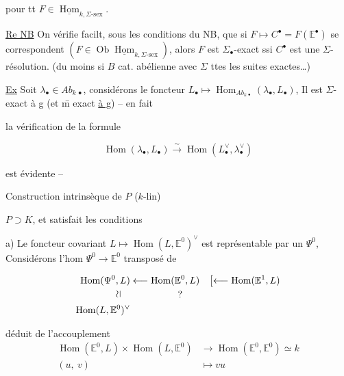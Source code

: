 pour tt $F\in\underline{\operatorname{Hom}}_{k,\Sigma\text{-}\mathrm{sex}}$.

\uline{Re NB} On  vérifie facilt, sous les conditions du NB, que si $F\longmapsto C^{\bullet}=F(\mathbb E^{\bullet})$ se correspondent $(F\in\operatorname{Ob}\underline{\operatorname{Hom}}_{k,\Sigma\text{-}\mathrm{sex}})$, alors $F$ est $\Sigma_{\bullet}$-exact ssi $C^{\bullet}$ est une $\Sigma$-résolution. (du moins si $B$ cat. abélienne avec $\Sigma$ ttes les suites exactes…)

\uline{Ex} Soit $\lambda_{\bullet}\in Ab_{k\,\bullet}$, considérons le foncteur $L_{\bullet}\longmapsto\operatorname{Hom}_{Ab_{k\,\bullet}}(\lambda_{\bullet},L_{\bullet})$,  Il est $\Sigma$-exact à g (et \={m} exact \uline{à g}) -- en fait



la vérification de la formule

\[
 \operatorname{Hom}(\lambda_{\bullet},L_{\bullet})\overset{\sim}{\longrightarrow}\operatorname{Hom}(L_{\bullet}^{\vee},\lambda_{\bullet}^{\vee})
\]

est évidente --


Construction intrinsèque de $P$ ($k$-lin)

$P\supset K$, et satisfait les conditions

a) Le foncteur covariant $L\longmapsto\operatorname{Hom}(L,\mathbb E^0)^\vee$ est représentable par un  $\Psi^0$, Considérons l'hom $\Psi^0\longrightarrow\mathbb E^0$ transposé de

\[
\begin{aligned}
\operatorname{Hom}(\Psi^0,L)&\longleftarrow\operatorname{Hom}(\mathbb E^0,L)\quad\bigl[\longleftarrow\operatorname{Hom}(\mathbb E^1,L)\\
\rotatebox{90}{$\simeq$}\quad&\hspace{5em}?\\
\operatorname{Hom}(L,\mathbb E^0)^\vee&
\end{aligned}
\]

déduit de l'accouplement
\[
\begin{aligned}
\operatorname{Hom}(\mathbb E^0,L)\times\operatorname{Hom}(L,\mathbb E^0)&\longrightarrow\operatorname{Hom}(\mathbb E^0,\mathbb E^0)\simeq k\\
(u,\ v)&\longmapsto vu
\end{aligned}
\]

